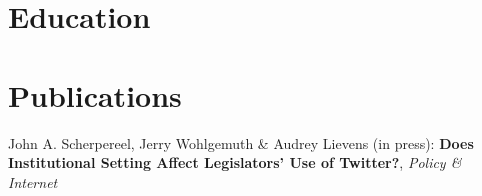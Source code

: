 \documentclass[10pt,a4paper,merriweather]{moderncv}        %
\begin{document}
\section{Education}

\section{Publications}
\small John A. Scherpereel, Jerry Wohlgemuth \& Audrey Lievens (in press): \textbf{Does Institutional Setting Affect Legislators’ Use of Twitter?}, \textit{Policy \& Internet}

\clearpage





\end{document}
